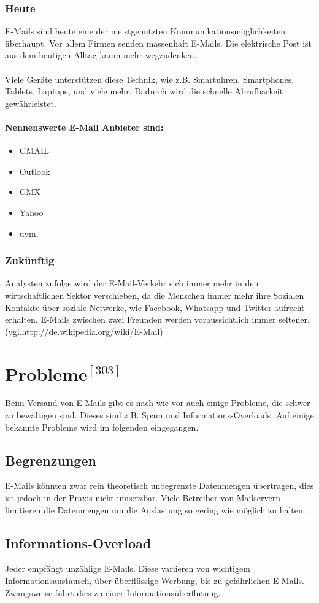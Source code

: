 \documentclass[12pt,a4paper]{report}
\begin{document}
\begin{onehalfspace}
\subsubsection{Heute}
E-Mails sind heute eine der meistgenutzten Kommunikationsmöglichkeiten überhaupt. Vor allem Firmen senden massenhaft E-Mails. Die elektrische Post ist aus dem heutigen Alltag kaum mehr wegzudenken.\\\\
Viele Geräte unterstützen diese Technik, wie z.B. Smartuhren, Smartphones, Tablets, Laptops, und viele mehr. Dadurch wird die schnelle Abrufbarkeit gewährleistet.
\paragraph{Nennenswerte E-Mail Anbieter sind:}
\begin{itemize}
\item GMAIL
\item Outlook
\item GMX
\item Yahoo
\item uvm.
\end{itemize} 
\subsubsection{Zukünftig}
Analysten zufolge wird der E-Mail-Verkehr sich immer mehr in den wirtschaftlichen Sektor verschieben, da die Menschen immer mehr ihre Sozialen Kontakte über soziale Netwerke, wie Facebook, Whatsapp und Twitter aufrecht erhalten. E-Mails zwischen zwei Freunden werden voraussichtlich immer seltener. (vgl.http://de.wikipedia.org/wiki/E-Mail)
\section*{Probleme$^{[303]}$}
Beim Versand von E-Mails gibt es nach wie vor auch einige Probleme, die schwer zu bewältigen sind. Dieses sind z.B. Spam und Informations-Overloads. Auf einige bekannte Probleme wird im folgenden eingegangen.
\subsection{Begrenzungen}
E-Mails könnten zwar rein theoretisch unbegrenzte Datenmengen übertragen, dies ist jedoch in der Praxis nicht umsetzbar. Viele Betreiber von Mailservern limitieren die Datenmengen um die Auslastung so gering wie möglich zu halten. 
\subsection{Informations-Overload}
Jeder empfängt unzählige E-Mails. Diese variieren von wichtigem Informationsaustausch, über überflüssige Werbung, bis zu gefährlichen E-Mails. Zwangsweise führt dies zu einer Informationsüberflutung. 

\end{onehalfspace}
\end{document}
